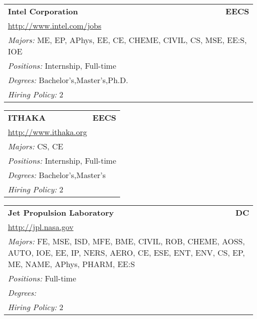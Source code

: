 \documentclass[twoside]{article}
\begin{document}
\begin{center}
\begin{multicols}{3}
\begin{FlushLeft}
\begin{minipage}{\columnwidth}
\end{minipage}
 
\begin{minipage}{\columnwidth}\begin{tabularx}{.95\columnwidth}{Xr}
                 {\Large\bf Intel Corporation} & {\Large\bf EECS}\\
    \multicolumn{2}{p{.95\columnwidth}}{\url{http://www.intel.com/jobs}}\\
    \multicolumn{2}{p{.95\columnwidth}}{\emph{Majors:} ME, EP, APhys, EE, CE, CHEME, CIVIL, CS, MSE, EE:S, IOE}\\
    \multicolumn{2}{p{.95\columnwidth}}{\emph{Positions:} Internship, Full-time}\\
    \multicolumn{2}{p{.95\columnwidth}}{\emph{Degrees:} Bachelor's,Master's,Ph.D.}\\
    \multicolumn{2}{p{.95\columnwidth}}{\emph{Hiring Policy:} 2}\\
    \end{tabularx}
    
\end{minipage}
 
\begin{minipage}{\columnwidth}\begin{tabularx}{.95\columnwidth}{Xr}
                 {\Large\bf ITHAKA} & {\Large\bf EECS}\\
    \multicolumn{2}{p{.95\columnwidth}}{\url{http://www.ithaka.org}}\\
    \multicolumn{2}{p{.95\columnwidth}}{\emph{Majors:} CS, CE}\\
    \multicolumn{2}{p{.95\columnwidth}}{\emph{Positions:} Internship, Full-time}\\
    \multicolumn{2}{p{.95\columnwidth}}{\emph{Degrees:} Bachelor's,Master's}\\
    \multicolumn{2}{p{.95\columnwidth}}{\emph{Hiring Policy:} 2}\\
    \end{tabularx}
    
\end{minipage}
 
\begin{minipage}{\columnwidth}\begin{tabularx}{.95\columnwidth}{Xr}
                 {\Large\bf Jet Propulsion Laboratory} & {\Large\bf DC}\\
    \multicolumn{2}{p{.95\columnwidth}}{\url{http://jpl.nasa.gov}}\\
    \multicolumn{2}{p{.95\columnwidth}}{\emph{Majors:} FE, MSE, ISD, MFE, BME, CIVIL, ROB, CHEME, AOSS, AUTO, IOE, EE, IP, NERS, AERO, CE, ESE, ENT, ENV, CS, EP, ME, NAME, APhys, PHARM, EE:S}\\
    \multicolumn{2}{p{.95\columnwidth}}{\emph{Positions:} Full-time}\\
    \multicolumn{2}{p{.95\columnwidth}}{\emph{Degrees:} }\\
    \multicolumn{2}{p{.95\columnwidth}}{\emph{Hiring Policy:} 2}\\
    \end{tabularx}
    

\end{minipage}
\end{FlushLeft}
\end{multicols}
\end{center}
\end{document}
